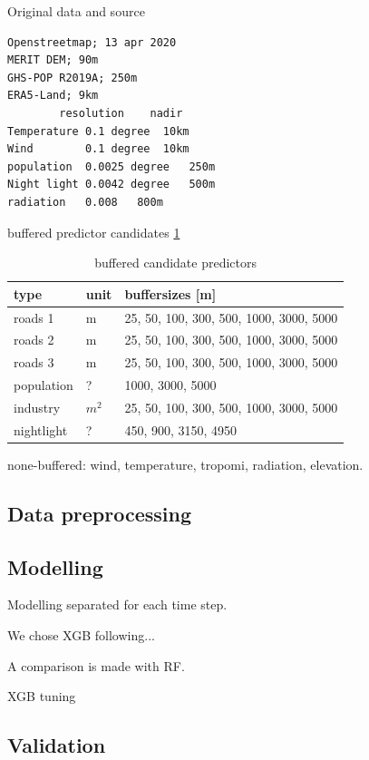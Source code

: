 \documentclass{article}
\begin{document}
Original data and source
\begin{verbatim}
Openstreetmap; 13 apr 2020
MERIT DEM; 90m
GHS-POP R2019A; 250m
ERA5-Land; 9km
        resolution	  nadir
Temperature	0.1 degree	10km
Wind 	    0.1 degree	10km
population	0.0025 degree 	250m
Night light	0.0042 degree	500m
radiation	0.008	800m

\end{verbatim}



buffered predictor candidates \ref{tab-buff-pred}
  
\begin{table}\centering
\caption{buffered candidate predictors}
\label{tab-buff-pred}
\begin{tabular}{@{}lll@{}}\toprule
type & unit & buffersizes [m] \\ \midrule
roads 1 & m & 25, 50, 100, 300, 500, 1000, 3000, 5000 \\
roads 2 & m& 25, 50, 100, 300, 500, 1000, 3000, 5000 \\
roads 3 & m& 25, 50, 100, 300, 500, 1000, 3000, 5000 \\
population  &? & 1000, 3000, 5000 \\
industry  & $m^2$ & 25, 50, 100, 300, 500, 1000, 3000, 5000\\
nightlight   & ?& 450, 900, 3150, 4950\\
\bottomrule
\end{tabular}
\end{table}

none-buffered: wind, temperature, tropomi, radiation, elevation.

\subsection{Data preprocessing}

\subsection{Modelling}
Modelling separated for each time step.

We chose XGB following...

A comparison is made with RF. 

XGB tuning

\subsection{Validation}
\end{document}

